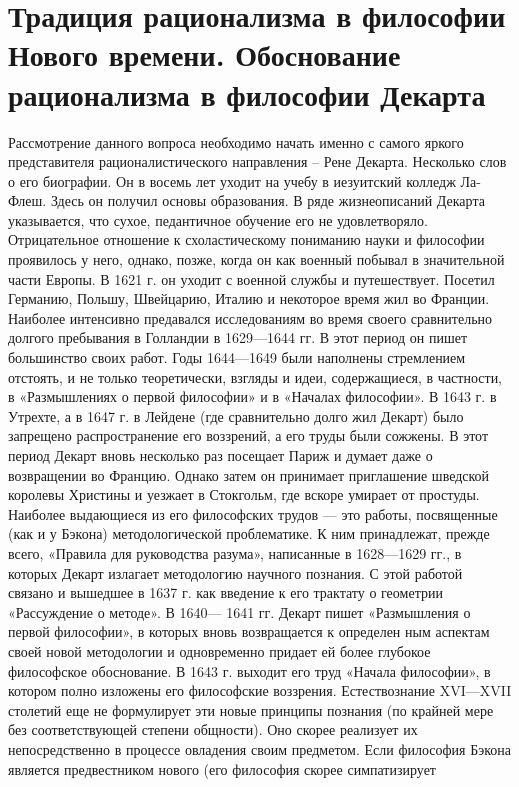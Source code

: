\documentclass[12pt]{article}
\begin{document}
\section{Традиция рационализма в философии Нового времени. Обоснование рационализма в философии Декарта}
Рассмотрение данного вопроса необходимо начать именно с самого яркого представителя рационалистического
направления – Рене Декарта. Несколько слов о его биографии. Он в восемь лет уходит на учебу в иезуитский
колледж Ла-Флеш. Здесь он получил основы образования. В ряде жизнеописаний Декарта указывается, что
сухое, педантичное обучение его не удовлетворяло. Отрицательное отношение к схоластическому пониманию
науки и философии проявилось у него, однако, позже, когда он как военный побывал в значительной части
Европы. В 1621 г. он уходит с военной службы и путешествует. Посетил Германию, Польшу, Швейцарию,
Италию и некоторое время жил во Франции. Наиболее интенсивно предавался исследованиям во время своего
сравнительно долгого пребывания в Голландии в 1629—1644 гг. В этот период он пишет большинство своих
работ. Годы 1644—1649 были наполнены стремлением отстоять, и не только теоретически, взгляды и идеи,
содержащиеся, в частности, в «Размышлениях о первой философии» и в «Началах философии». В 1643 г. в
Утрехте, а в 1647 г. в Лейдене (где сравнительно долго жил Декарт) было запрещено распространение его
воззрений, а его труды были сожжены. В этот период Декарт вновь несколько раз посещает Париж и думает
даже о возвращении во Францию. Однако затем он принимает приглашение шведской королевы Христины и
уезжает в Стокгольм, где вскоре умирает от простуды.
Наиболее выдающиеся из его философских трудов — это работы, посвященные (как и у Бэкона)
методологической проблематике. К ним принадлежат, прежде всего, «Правила для руководства разума»,
написанные в 1628—1629 гг., в которых Декарт излагает методологию научного познания. С этой работой
связано и вышедшее в 1637 г. как введение к его трактату о геометрии «Рассуждение о методе». В 1640— 1641
гг. Декарт пишет «Размышления о первой философии», в которых вновь возвращается к определен ным
аспектам своей новой методологии и одновременно придает ей более глубокое философское обоснование. В
1643 г. выходит его труд «Начала философии», в котором полно изложены его философские воззрения.
Естествознание XVI—XVII столетий еще не формулирует эти новые принципы познания (по крайней мере без
соответствующей степени общности). Оно скорее реализует их непосредственно в процессе овладения своим
предметом. Если философия Бэкона является предвестником нового (его философия скорее симпатизирует
\end{document}
